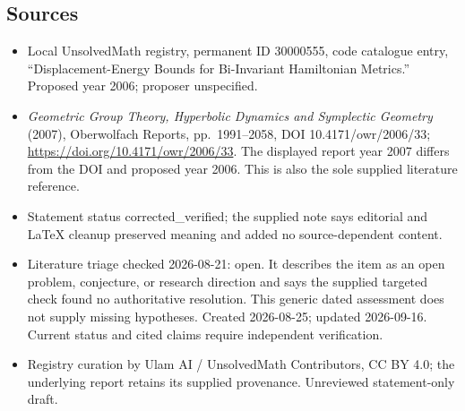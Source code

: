 \documentclass[11pt]{article}
\begin{document}
\subsection{Sources}
\begin{itemize}
\item Local UnsolvedMath registry, permanent ID 30000555, code catalogue entry, ``Displacement-Energy Bounds for Bi-Invariant Hamiltonian Metrics.'' Proposed year 2006; proposer unspecified.
\item \emph{Geometric Group Theory, Hyperbolic Dynamics and Symplectic Geometry} (2007), Oberwolfach Reports, pp.\ 1991--2058, DOI 10.4171/owr/2006/33; \url{https://doi.org/10.4171/owr/2006/33}. The displayed report year 2007 differs from the DOI and proposed year 2006. This is also the sole supplied literature reference.
\item Statement status corrected\_verified; the supplied note says editorial and LaTeX cleanup preserved meaning and added no source-dependent content.
\item Literature triage checked 2026-08-21: open. It describes the item as an open problem, conjecture, or research direction and says the supplied targeted check found no authoritative resolution. This generic dated assessment does not supply missing hypotheses. Created 2026-08-25; updated 2026-09-16. Current status and cited claims require independent verification.
\item Registry curation by Ulam AI / UnsolvedMath Contributors, CC BY 4.0; the underlying report retains its supplied provenance. Unreviewed statement-only draft.
\end{itemize}
\end{document}
